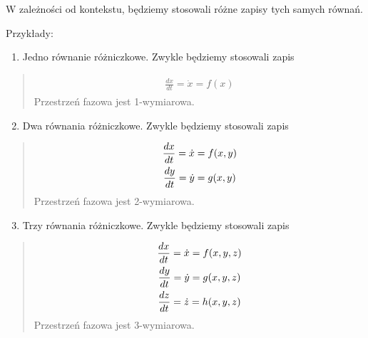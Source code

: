 \documentclass[a4paper,12pt,polish]{sphinxmanual}
\begin{document}
W zależności od kontekstu, będziemy stosowali różne zapisy tych samych równań.

Przykłady:
\begin{enumerate}
\item {} 
Jedno równanie różniczkowe. Zwykle będziemy stosowali  zapis

\end{enumerate}
\begin{quote}
\label{ch1/chI021:equation-eqn25}\begin{gather}
\begin{split}\frac{dx}{dt} = \dot x = f(x)\end{split}\label{ch1/chI021-eqn25}
\end{gather}
Przestrzeń fazowa  jest 1-wymiarowa.
\end{quote}
\begin{enumerate}
\setcounter{enumi}{1}
\item {} 
Dwa równania różniczkowe. Zwykle będziemy stosowali  zapis

\end{enumerate}
\begin{quote}
\label{ch1/chI021:equation-eqn26}\begin{gather}
\begin{split}\frac{dx}{dt} = \dot x = f(x, y)\end{split}\label{ch1/chI021-eqn26}\\\begin{split}\frac{dy}{dt} = \dot y= g(x, y)\end{split}\notag
\end{gather}
Przestrzeń fazowa  jest 2-wymiarowa.
\end{quote}
\begin{enumerate}
\setcounter{enumi}{2}
\item {} 
Trzy  równania różniczkowe. Zwykle będziemy stosowali  zapis

\end{enumerate}
\begin{quote}
\label{ch1/chI021:equation-eqn28}\begin{gather}
\begin{split}\frac{dx}{dt} = \dot x = f(x, y, z)\end{split}\label{ch1/chI021-eqn28}\\\begin{split}\frac{dy}{dt} = \dot y= g(x, y, z)\end{split}\notag\\\begin{split}\frac{dz}{dt} = \dot z= h(x, y, z)\end{split}\notag
\end{gather}
Przestrzeń fazowa  jest 3-wymiarowa.
\end{quote}
\end{document}
